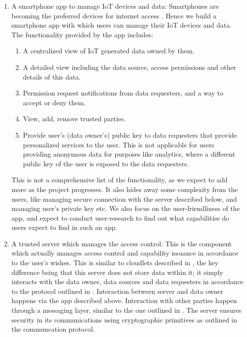 \begin{enumerate}
	\item A smartphone app to manage IoT devices and data: Smartphones are becoming the preferred devices for internet access \cite{statcount}. Hence we build a smartphone app with which users can manage their IoT devices and data. The functionality provided by the app includes:

	\begin{enumerate}
		\item A centralized view of IoT generated data owned by them.

		\item A detailed view including the data source, access permissions and other details of this data.

		\item Permission request notifications from data requesters, and a way to accept or deny them.

		\item View, add, remove trusted parties.

		\item Provide user's (data owner's) public key to data requesters that provide personalized services to the user. This is not applicable for users providing anonymous data for purposes like analytics, where a different public key of the user is exposed to the data requesters.

	\end{enumerate}

	This is not a comprehensive list of the functionality, as we expect to add more as the project progresses. It also hides away some complexity from the users, like managing secure connection with the server described below, and managing user's private key etc. We also focus on the user-friendliness of the app, and expect to conduct user-research to find out what capabilities do users expect to find in such an app.
	
	\item A trusted server which manages the access control: This is the component which actually manages access control and capability issuance in accordance to the user's wishes. This is similar to cloudlets described in \cite{davies}, the key difference being that this server does not store data within it; it simply interacts with the data owner, data sources and data requesters in accordance to the protocol outlined in \cite{campbell}. Interaction between server and data owner happens via the app described above. Interaction with other parties happen through a messaging layer, similar to the one outlined in \cite{campbell}. The server ensures security in its communications using cryptographic primitives as outlined in the communcation protocol.


\end{enumerate}
